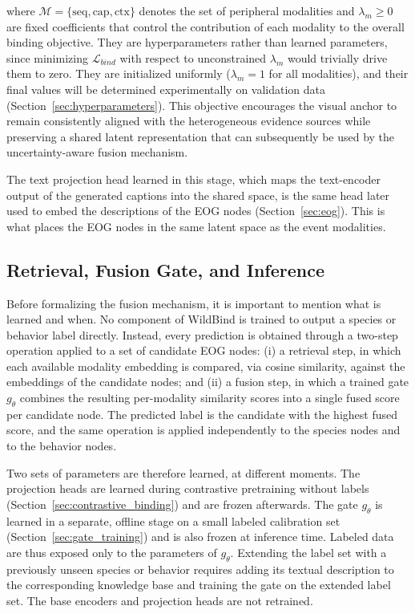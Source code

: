 where $\mathcal{M}=\{\mathrm{seq},\mathrm{cap},\mathrm{ctx}\}$ denotes the set of peripheral modalities and $\lambda_m\ge 0$ are fixed coefficients that control the contribution of each modality to the overall binding objective. They are hyperparameters rather than learned parameters, since minimizing $\mathcal{L}_{bind}$ with respect to unconstrained $\lambda_m$ would trivially drive them to zero. They are initialized uniformly ($\lambda_m=1$ for all modalities), and their final values will be determined experimentally on validation data (Section~\ref{sec:hyperparameters}). This objective encourages the visual anchor to remain consistently aligned with the heterogeneous evidence sources while preserving a shared latent representation that can subsequently be used by the uncertainty-aware fusion mechanism.

The text projection head learned in this stage, which maps the text-encoder output of the generated captions into the shared space, is the same head later used to embed the descriptions of the EOG nodes (Section~\ref{sec:eog}). This is what places the EOG nodes in the same latent space as the event modalities.

\subsection{Retrieval, Fusion Gate, and Inference}\label{sec:fusion_gate}

Before formalizing the fusion mechanism, it is important to mention what is learned and when. No component of WildBind is trained to output a species or behavior label directly. Instead, every prediction is obtained through a two-step operation applied to a set of candidate EOG nodes: (i) a retrieval step, in which each available modality embedding is compared, via cosine similarity, against the embeddings of the candidate nodes; and (ii) a fusion step, in which a trained gate $g_\theta$ combines the resulting per-modality similarity scores into a single fused score per candidate node. The predicted label is the candidate with the highest fused score, and the same operation is applied independently to the species nodes and to the behavior nodes.

Two sets of parameters are therefore learned, at different moments. The projection heads are learned during contrastive pretraining without labels (Section~\ref{sec:contrastive_binding}) and are frozen afterwards. The gate $g_\theta$ is learned in a separate, offline stage on a small labeled calibration set (Section~\ref{sec:gate_training}) and is also frozen at inference time. Labeled data are thus exposed only to the parameters of $g_\theta$. Extending the label set with a previously unseen species or behavior requires adding its textual description to the corresponding knowledge base and training the gate on the extended label set. The base encoders and projection heads are not retrained.

